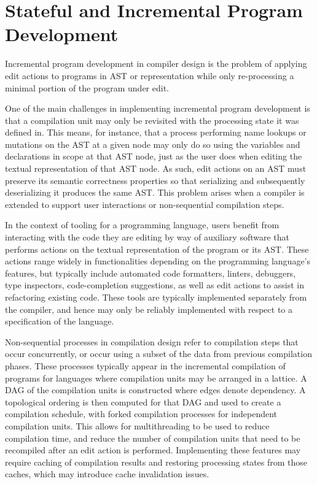 \section{Stateful and Incremental Program Development}

Incremental program development in compiler design is the problem of applying edit actions to programs in \ac{AST} or representation while only re-processing a minimal portion of the program under edit.

One of the main challenges in implementing incremental program development is that a compilation unit may only be revisited with the processing state it was defined in.
This means, for instance, that a process performing name lookups or mutations on the \ac{AST} at a given node may only do so using the variables and declarations in scope at that \ac{AST} node, just as the user does when editing the textual representation of that \ac{AST} node.
As such, edit actions on an \ac{AST} must preserve its semantic correctness properties so that serializing and subsequently deserializing it produces the same \ac{AST}.
This problem arises when a compiler is extended to support user interactions or non-sequential compilation steps.

In the context of tooling for a programming language, users benefit from interacting with the code they are editing by way of auxiliary software that performs actions on the textual representation of the program or its \ac{AST}.
These actions range widely in functionalities depending on the programming language's features, but typically include automated code formatters, linters, debuggers, type inspectors, code-completion suggestions, as well as edit actions to assist in refactoring existing code.
These tools are typically implemented separately from the compiler, and hence may only be reliably implemented with respect to a specification of the language.


Non-sequential processes in compilation design refer to compilation steps that occur concurrently, or occur using a subset of the data from previous compilation phases.
These processes typically appear in the incremental compilation of programs for languages where compilation units may be arranged in a lattice.
A \ac{DAG} of the compilation units is constructed where edges denote dependency.
A topological ordering is then computed for that \ac{DAG} and used to create a compilation schedule, with forked compilation processes for independent compilation units.
This allows for multithreading to be used to reduce compilation time, and reduce the number of compilation units that need to be recompiled after an edit action is performed.
Implementing these features may require caching of compilation results and restoring processing states from those caches, which may introduce cache invalidation issues.

